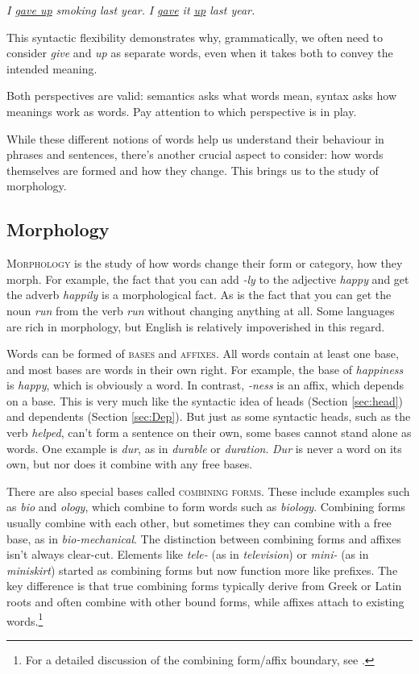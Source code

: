 \ea
\ea \textit{I \uline{gave up} smoking last year.}
\ex \textit{I \uline{gave} it \uline{up} last year.}
\z\z

This syntactic flexibility demonstrates why, grammatically, we often need to consider \textit{give} and \textit{up} as separate words, even when it takes both to convey the intended meaning.

Both perspectives are valid: semantics asks what words mean, syntax asks how meanings work as words. Pay attention to which perspective is in play.

While these different notions of words help us understand their behaviour in phrases and sentences, there's another crucial aspect to consider: how words themselves are formed and how they change. This brings us to the study of morphology.

\subsection{Morphology} \label{sec:morphology}

\textsc{Morphology} is the study of how words change their form or category, how they morph. For example, the fact that you can add \textit{-ly} to the adjective \textit{happy} and get the adverb \textit{happily} is a morphological fact. As is the fact that you can get the noun \textit{run} from the verb \textit{run} without changing anything at all. Some languages are rich in morphology, but English is relatively impoverished in this regard.

Words can be formed of \textsc{bases} and \textsc{affixes}. All words contain at least one base, and most bases are words in their own right. For example, the base of \textit{happiness} is \textit{happy}, which is obviously a word. In contrast, \textit{-ness} is an affix, which depends on a base. This is very much like the syntactic idea of heads (Section \ref{sec:head}) and dependents (Section \ref{sec:Dep}). But just as some syntactic heads, such as the verb \textit{helped}, can't form a sentence on their own, some bases cannot stand alone as words. One example is \textit{dur}, as in \textit{durable} or \textit{duration}. \textit{Dur} is never a word on its own, but nor does it combine with any free bases.

There are also special bases called \textsc{combining forms}. These include examples such as \textit{bio} and \textit{ology}, which combine to form words such as \textit{biology}. Combining forms usually combine with each other, but sometimes they can combine with a free base, as in \textit{bio-mechanical}. The distinction between combining forms and affixes isn't always clear-cut. Elements like \textit{tele-} (as in \textit{television}) or \textit{mini-} (as in \textit{miniskirt}) started as combining forms but now function more like prefixes. The key difference is that true combining forms typically derive from Greek or Latin roots and often combine with other bound forms, while affixes attach to existing words.\footnote{For a detailed discussion of the combining form/affix boundary, see \citet{Bauer1983}.}

